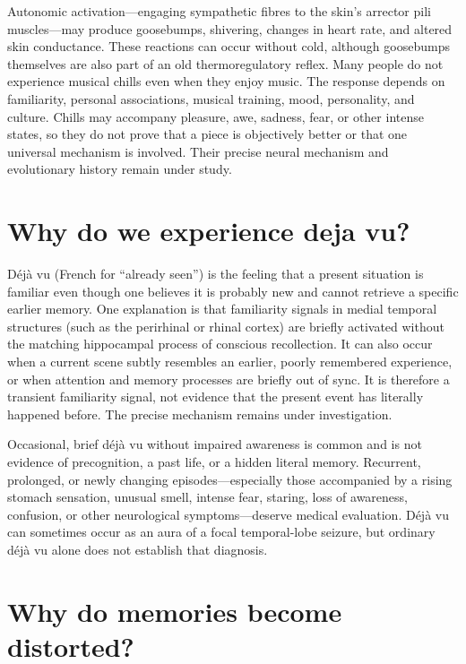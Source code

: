 \documentclass[11pt,oneside]{report}
\begin{document}
Autonomic activation—engaging sympathetic fibres to the skin's arrector pili
muscles—may produce goosebumps, shivering, changes in heart rate,
and altered skin conductance. These reactions can occur without cold, although
goosebumps themselves are also part of an old thermoregulatory reflex. Many
people do not experience musical chills even when they enjoy music. The
response depends on familiarity, personal associations, musical training,
mood, personality, and culture. Chills may accompany pleasure, awe, sadness,
fear, or other intense states, so they do not prove that a piece is objectively
better or that one universal mechanism is involved. Their precise neural
mechanism and evolutionary history remain under study.

\section{Why do we experience deja vu?}

Déjà vu (French for ``already seen'') is the feeling that a present situation is
familiar even though one believes it is probably new and cannot retrieve a
specific earlier memory. One explanation is that familiarity signals in medial temporal structures
(such as the perirhinal or rhinal cortex) are briefly activated without the
matching hippocampal process of conscious recollection. It can also occur when a
current scene subtly resembles an earlier, poorly remembered experience, or when
attention and memory processes are briefly out of sync. It is therefore a transient familiarity signal, not evidence that the
present event has literally happened before. The precise mechanism remains under
investigation.

Occasional, brief déjà vu without impaired awareness is common and is not evidence
of precognition, a past life, or a hidden literal memory. Recurrent, prolonged,
or newly changing
episodes---especially those accompanied by a rising stomach sensation, unusual
smell, intense fear, staring, loss of awareness, confusion, or other neurological
symptoms---deserve medical evaluation. Déjà vu can sometimes occur as an aura of
a focal temporal-lobe seizure, but ordinary déjà vu alone does not establish
that diagnosis.

\section{Why do memories become distorted?}
\end{document}
